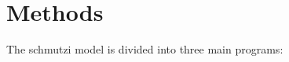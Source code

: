 \documentclass[a4paper,12pt]{article}
\begin{document}
\clearpage































\section{Methods}

The schmutzi model is divided into three main programs: 
\end{document}
